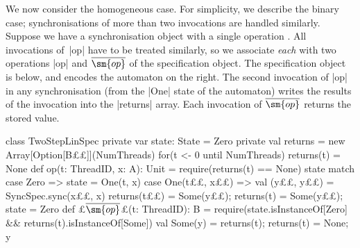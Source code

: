 We now consider the homogeneous case.  For simplicity, we describe the binary
case; synchronisations of more than two invocations are handled similarly.
Suppose we have a synchronisation object with a single operation 
.
All invocations of~|op| have to be treated similarly, so we associate
\emph{each} with two operations |op| and $\overline{\sm{op}}$ of the
specification object.  The specification object is below, and encodes the
automaton on the right.
%
The second invocation of |op| in any synchronisation (from the |One| state of the
automaton) writes the results of the invocation into the |returns| array.
Each invocation of $\overline{\sm{op}}$ returns the stored value.

\begin{trivlist}
\item[]
\begin{minipage}{92mm}
\begin{scala}
class TwoStepLinSpec{
  private var state: State = Zero
  private val returns = new Array[Option[B££]](NumThreads)
  for(t <- 0 until NumThreads) returns(t) = None
  def op(t: ThreadID, x: A): Unit = {
    require(returns(t) == None)
    state match{
      case Zero => state = One(t, x)
      case One(t££, x££) => 
        val (y££, y££) = SyncSpec.sync(x££, x) 
        returns(t££) = Some(y££); returns(t) = Some(y££); state = Zero
    }
  }
  def £$\overline{\sm{op}}$£(t: ThreadID): B = {
    require(state.isInstanceOf[Zero] && returns(t).isInstanceOf[Some])
    val Some(y) = returns(t); returns(t) = None; y
  }
}
\end{scala}
\end{minipage}
\hfill 
%
\begin{minipage}{37.8mm}
%
\vspace{40mm}
\end{minipage}%
\end{trivlist}
